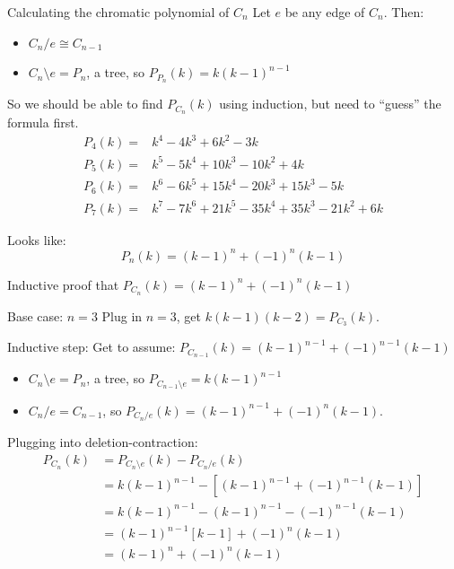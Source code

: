 \documentclass{beamer}
\begin{document}
\begin{frame}{Calculating the chromatic polynomial of $C_n$}
  Let $e$ be any edge of $C_n$.  Then:
  \begin{itemize}
  \item $C_n/e \cong C_{n-1}$
  \item $C_n\setminus e=P_n$, a tree, so $P_{P_n}(k)=k(k-1)^{n-1}$
  \end{itemize}

  So we should be able to find $P_{C_n}(k)$ using induction, but need to ``guess'' the formula first.
 \begin{align*}
    P_4(k)= & k^4-4k^3+6k^2-3k \\
P_5(k)= & k^5-5k^4+10k^3-10k^2+4k \\
P_6(k)= & k^6-6k^5+15k^4-20k^3+15k^3-5k \\
P_7(k)= & k^7-7k^6+21k^5-35k^4+35k^3-21k^2+6k
 \end{align*}
 \pause
\begin{block}{Looks like:}
$$P_n(k)=(k-1)^n+(-1)^n(k-1)$$
  \end{block}
\end{frame}

\begin{frame}{Inductive proof that $P_{C_n}(k)=(k-1)^n+(-1)^n(k-1)$}
  \begin{block}{Base case: $n=3$}
Plug in $n=3$, get $k(k-1)(k-2)=P_{C_3}(k)$.
  \end{block}

  \begin{block}{Inductive step:}
   Get to assume: $P_{C_{n-1}}(k)=(k-1)^{n-1}+(-1)^{n-1}(k-1)$

    \begin{itemize}
      \item $C_n\setminus e=P_n$, a tree, so $P_{C_{n-1}\setminus e}=k(k-1)^{n-1}$
      \item $C_n/e=C_{n-1}$, so $P_{C_n/e}(k)=(k-1)^{n-1}+(-1)^n(k-1)$.
        \end{itemize}
\end{block}
    \begin{block}{Plugging into deletion-contraction:}   \begin{align*}
      P_{C_n}(k)&=P_{C_n\setminus e}(k)-P_{C_n/e}(k) \\
      &=k(k-1)^{n-1}-\left[(k-1)^{n-1}+(-1)^{n-1}(k-1)\right] \\
      &=k(k-1)^{n-1}-(k-1)^{n-1}-(-1)^{n-1}(k-1) \\
      &=(k-1)^{n-1}\left[k-1\right] +(-1)^n(k-1) \\
      &=(k-1)^n+(-1)^n(k-1)
    \end{align*}
    \end{block}

\end{frame}
\end{document}
